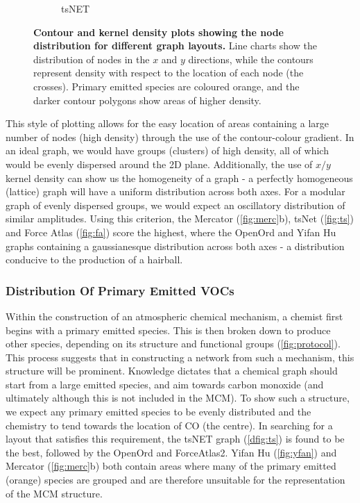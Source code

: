 \begin{figure}[H]
\begin{subfigure}[b]{.49\textwidth}
         \caption{tsNET}
         \label{fig:ts}
     \end{subfigure}
      \hfill
        \caption{ \textbf{Contour and kernel density plots showing the node distribution for different graph layouts.} Line charts show the distribution of nodes in the $x$ and $y$ directions, while the contours represent density with respect to the location of each node (the crosses). Primary emitted species are coloured orange, and the darker contour polygons show areas of higher density.}
        \label{fig:densitycompare}
\end{figure}

This style of plotting allows for the easy location of areas containing a large number of nodes (high density) through the use of the contour-colour gradient. In an ideal graph, we would have groups (clusters) of high density, all of which would be evenly dispersed around the 2D plane.
Additionally, the use of $x/y$ kernel density can show us the homogeneity of a graph - a perfectly homogeneous (lattice) graph will have a uniform distribution across both axes. For a modular graph of evenly dispersed groups, we would expect an oscillatory distribution of similar amplitudes. Using this criterion, the Mercator (\autoref{fig:merc}b), tsNet (\autoref{fig:ts}) and Force Atlas (\autoref{fig:fa}) score the highest, where the OpenOrd and Yifan Hu graphs containing a gaussianesque distribution across both axes - a distribution conducive to the production of a hairball.

\subsubsection{Distribution Of Primary Emitted VOCs}

Within the construction of an atmospheric chemical mechanism, a chemist first begins with a primary emitted species. This is then broken down to produce other species, depending on its structure and functional groups (\autoref{fig:protocol}). This process suggests that in constructing a network from such a mechanism, this structure will be prominent. Knowledge dictates that a chemical graph should start from a large emitted species, and aim towards carbon monoxide (and ultimately  although this is not included in the MCM). To show such a structure, we expect any primary emitted species to be evenly distributed and the chemistry to tend towards the location of CO (the centre). In searching for a layout that satisfies this requirement, the tsNET graph (\autoref{dfig:ts}) is found to be the best, followed by the OpenOrd and ForceAtlas2. Yifan Hu (\autoref{fig:yfan}) and Mercator (\autoref{fig:merc}b) both contain areas where many of the primary emitted (orange) species are grouped and are therefore unsuitable for the representation of the MCM structure.


